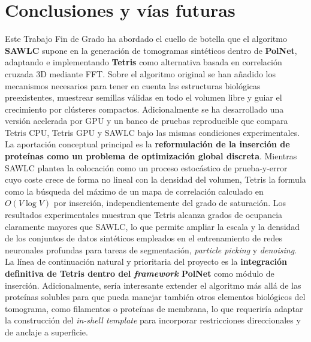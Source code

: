

\chapter{Conclusiones y vías futuras}

Este Trabajo Fin de Grado ha abordado el cuello de botella que el algoritmo \textbf{SAWLC} supone en la generación de tomogramas sintéticos dentro de \textbf{PolNet}, adaptando e implementando \textbf{Tetris} como alternativa basada en correlación cruzada 3D mediante FFT. Sobre el algoritmo original se han añadido los mecanismos necesarios para tener en cuenta las estructuras biológicas preexistentes, muestrear semillas válidas en todo el volumen libre y guiar el crecimiento por clústeres compactos. Adicionalmente se ha desarrollado una versión acelerada por GPU y un banco de pruebas reproducible que compara Tetris CPU, Tetris GPU y SAWLC bajo las mismas condiciones experimentales.\\

La aportación conceptual principal es la \textbf{reformulación de la inserción de proteínas como un problema de optimización global discreta}. Mientras SAWLC plantea la colocación como un proceso estocástico de prueba-y-error cuyo coste crece de forma no lineal con la densidad del volumen, Tetris la formula como la búsqueda del máximo de un mapa de correlación calculado en $O(V \log V)$ por inserción, independientemente del grado de saturación. Los resultados experimentales muestran que Tetris alcanza grados de ocupancia claramente mayores que SAWLC, lo que permite ampliar la escala y la densidad de los conjuntos de datos sintéticos empleados en el entrenamiento de redes neuronales profundas para tareas de segmentación, \textit{particle picking} y \textit{denoising}.\\

La línea de continuación natural y prioritaria del proyecto es la \textbf{integración definitiva de Tetris dentro del \textit{framework} PolNet} como módulo de inserción. Adicionalmente, sería interesante extender el algoritmo más allá de las proteínas solubles para que pueda manejar también otros elementos biológicos del tomograma, como filamentos o proteínas de membrana, lo que requeriría adaptar la construcción del \textit{in-shell template} para incorporar restricciones direccionales y de anclaje a superficie.
